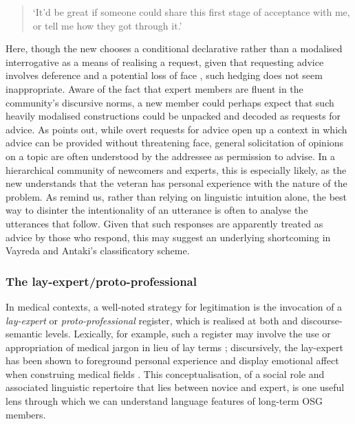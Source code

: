 \begin{quote}\small\singlespacing
`It'd be great if someone could share this first stage of acceptance with me, or tell me how they got through it.' \parencite*[p.~11]{vayreda_social_2009}
\end{quote} 
%
\noindent Here, though the new  chooses a conditional declarative rather than a modalised interrogative as a means of realising a request, given that requesting advice involves deference and a potential loss of face \cite{brown_politeness:_1987}, such hedging does not seem inappropriate. Aware of the fact that expert \glspl{member} are fluent in the community's discursive norms, a new member could perhaps expect that such heavily modalised constructions could be unpacked and decoded as requests for advice. As \textcite{goldsmith2000soliciting} points out, while overt requests for advice open up a context in which advice can be provided without threatening face, general solicitation of opinions on a topic are often understood by the addressee as permission to advise. In a hierarchical community of newcomers and experts, this is especially likely, as the new  understands that the veteran has personal experience with the nature of the problem. As \textcite{eggins_analysing_2004} remind us, rather than relying on linguistic intuition alone, the best way to disinter the intentionality of an utterance is often to analyse the utterances that follow. Given that such responses are apparently treated as advice by those who respond, this may suggest an underlying shortcoming in Vayreda and Antaki's classificatory scheme.

\subsubsection{The lay-expert\slash proto-professional}

In medical contexts, a well\hyp{}noted strategy for legitimation is the invocation of a \emph{lay\hyp{}expert} or \emph{proto\hyp{}professional} register, which is realised at both  and \gls{discourse-semantic} levels. Lexically, for example, such a register may involve the use or appropriation of medical jargon in lieu of lay terms \cite{harvey_disclosures_2012,sullivan_gendered_2003}; discursively, the lay\hyp{}expert has been shown to foreground personal experience and display emotional affect when construing medical fields \cite{wilson_expert_2007}. This conceptualisation, of a social role and associated linguistic repertoire that lies between novice and expert, is one useful lens through which we can understand language features of long\hyp{}term \gls{OSG} members.

